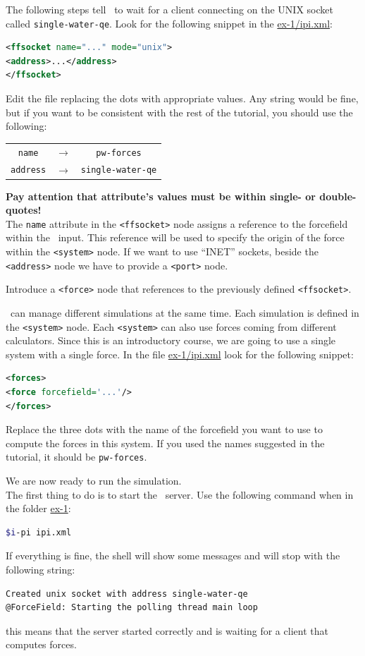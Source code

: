 \documentclass{article}
\begin{document}
\begin{Exercise}[label={i-pi},title={PIMD: a client/server approach}]
The following steps tell \ipi\ to wait for a client connecting on the UNIX
socket called \texttt{single-water-qe}. Look for the following snippet
in the \url{ex-1/ipi.xml}:
\begin{lstlisting}[language=xml]
<ffsocket name="..." mode="unix">
<address>...</address>
</ffsocket>
\end{lstlisting}
Edit the file replacing the dots with appropriate values. Any string
would be fine, but if you
want to be consistent with the rest of the tutorial, you should use
the following:
\begin{table}[h!]
  \centering
  \begin{tabular}{ccc}
    \texttt{name} & $\longrightarrow$ & \texttt{pw-forces}\\
    \texttt{address} & $\longrightarrow$ & \texttt{single-water-qe}
  \end{tabular}
\end{table}


\textbf{Pay attention that attribute's values must be within single- or
double-quotes!}\\


The \texttt{name} attribute in the \texttt{<ffsocket>} node assigns a
reference to the forcefield within the \ipi\ input. This reference
will be used to specify the origin of the force within the
\texttt{<system>} node. If we want to use ``INET'' sockets, beside the
\texttt{<address>} node we have to provide a \texttt{<port>} node.


\Question
Introduce a \texttt{<force>} node that references to the previously
 defined \texttt{<ffsocket>}.

\ipi\ can manage different simulations at the same time. Each
simulation is defined in the \texttt{<system>} node. Each
\texttt{<system>} can also use forces coming from different
calculators. Since this is an introductory course, we are going to use
a single system with a single force. In the file \url{ex-1/ipi.xml}
look for the following snippet:
\begin{lstlisting}[language=xml]
<forces>
<force forcefield='...'/>
</forces>
\end{lstlisting}
Replace the three dots with the name of the forcefield you want to use
to compute the forces in this system. If you used the names suggested
in the tutorial, it should be \texttt{pw-forces}.

\Question
We are now ready to run the simulation.\\

The first thing to do is to start the \ipi\ server. Use the following
command when in the folder \url{ex-1}:
\begin{lstlisting}[language=bash]
$i-pi ipi.xml
\end{lstlisting}%
If everything is fine, the shell will show some messages and will stop
with the following string:
\begin{lstlisting}[language=bash]
Created unix socket with address single-water-qe
@ForceField: Starting the polling thread main loop
\end{lstlisting}
this means that the server started correctly and is waiting for a
client that computes forces.


\end{Exercise}
\end{document}

